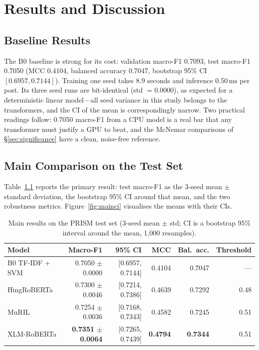 \chapter{Results and Discussion}
\label{ch:results}

\section{Baseline Results}
\label{sec:baseline}

The B0 baseline is strong for its cost: validation macro-F1 0.7093, test
macro-F1 0.7050 (MCC 0.4104, balanced accuracy 0.7047, bootstrap 95\% CI
$[0.6957, 0.7144]$). Training one seed takes 8.9 seconds and inference 0.50\,ms
per post. Its three seed runs are bit-identical (std $= 0.0000$), as expected for
a deterministic linear model---all seed variance in this study belongs to the
transformers, and the CI of the mean is correspondingly narrow. Two practical
readings follow: 0.7050 macro-F1 from a CPU model is a real bar that any
transformer must justify a GPU to beat, and the McNemar comparisons of
\S\ref{sec:significance} have a clean, noise-free reference.

\section{Main Comparison on the Test Set}
\label{sec:main}

Table~\ref{tab:main} reports the primary result: test macro-F1 as the 3-seed mean
$\pm$ standard deviation, the bootstrap 95\% CI around that mean, and the two
robustness metrics. Figure~\ref{fig:mainci} visualises the means with their CIs.

\begin{table}[htbp]
\centering
\caption[Main results on the PRISM test set]{Main results on the PRISM test set (3-seed mean $\pm$ std; CI is a
bootstrap 95\% interval around the mean, 1{,}000 resamples).}
\label{tab:main}
\small
\begin{tabular}{lrrrrr}
\toprule
Model & Macro-F1 & 95\% CI & MCC & Bal.\ acc. & Threshold \\
\midrule
B0 TF-IDF + SVM & 0.7050 $\pm$ 0.0000 & [0.6957, 0.7144] & 0.4104 & 0.7047 & --- \\
HingRoBERTa & 0.7300 $\pm$ 0.0046 & [0.7214, 0.7386] & 0.4639 & 0.7292 & 0.48 \\
MuRIL & 0.7254 $\pm$ 0.0036 & [0.7168, 0.7343] & 0.4582 & 0.7245 & 0.51 \\
XLM-RoBERTa & \textbf{0.7351 $\pm$ 0.0064} & [0.7265, 0.7439] & \textbf{0.4794} & \textbf{0.7344} & 0.51 \\
\bottomrule
\end{tabular}
\end{table}

